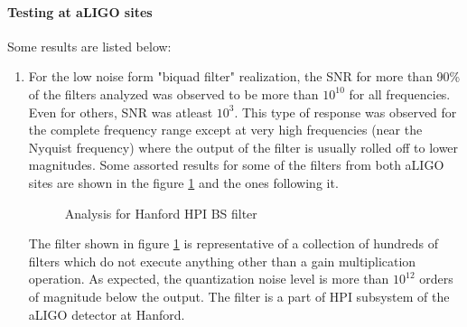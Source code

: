 \documentclass[colorlinks=true,pdfstartview=FitV,linkcolor=blue,
            citecolor=red,urlcolor=magenta]{ligodoc}
\begin{document}
		\paragraph{Testing at aLIGO sites} Some results are listed below:
	\begin{enumerate}
		\item For the low noise form "biquad filter" realization, the SNR for more than 90\% of the filters analyzed was observed to be more than $10^{10}$ for all frequencies. Even for others, SNR was atleast $10^{3}$. This type of response was observed for the complete frequency range except at very high frequencies (near the Nyquist frequency) where the output of the filter is usually rolled off to lower magnitudes. Some assorted results for some of the filters from both aLIGO sites are shown in the figure \ref{good} and the ones following it.
		\begin{figure}[H]
 
			  \centering
			  
			  \def\svgscale{0.5}
			  \tiny{
			  
			  }
			  \caption{Analysis for Hanford HPI BS filter}
			 \label{good}
		\end{figure}
		The filter shown in figure \ref{good} is representative of a collection of hundreds of filters which do not execute anything other than a gain multiplication operation. As expected, the quantization noise level is more than $10^{12}$ orders of magnitude below the output. The filter is a part of HPI subsystem of the aLIGO detector at Hanford.
		\begin{figure}[H]
 			

\end{figure}
\end{enumerate}
\end{document}
